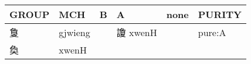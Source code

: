 \documentclass[14pt,a4paper]{scrartcl}
\begin{document}
\begin{longtable}[c]{@{}llllll@{}}
\toprule
\begin{minipage}[b]{0.14\columnwidth}\raggedright\strut
GROUP
\strut\end{minipage} &
\begin{minipage}[b]{0.14\columnwidth}\raggedright\strut
MCH
\strut\end{minipage} &
\begin{minipage}[b]{0.14\columnwidth}\raggedright\strut
B
\strut\end{minipage} &
\begin{minipage}[b]{0.14\columnwidth}\raggedright\strut
A
\strut\end{minipage} &
\begin{minipage}[b]{0.14\columnwidth}\raggedright\strut
none
\strut\end{minipage} &
\begin{minipage}[b]{0.14\columnwidth}\raggedright\strut
PURITY
\strut\end{minipage}\tabularnewline
\midrule
\endhead
\begin{minipage}[t]{0.14\columnwidth}\raggedright\strut
𢿌
\strut\end{minipage} &
\begin{minipage}[t]{0.14\columnwidth}\raggedright\strut
gjwieng
\strut\end{minipage} &
\begin{minipage}[t]{0.14\columnwidth}\raggedright\strut
\strut\end{minipage} &
\begin{minipage}[t]{0.14\columnwidth}\raggedright\strut
讂 xwenH
\strut\end{minipage} &
\begin{minipage}[t]{0.14\columnwidth}\raggedright\strut
\strut\end{minipage} &
\begin{minipage}[t]{0.14\columnwidth}\raggedright\strut
pure:A
\strut\end{minipage}\tabularnewline
\begin{minipage}[t]{0.14\columnwidth}\raggedright\strut
奐
\strut\end{minipage} &
\begin{minipage}[t]{0.14\columnwidth}\raggedright\strut
xwenH
\strut\end{minipage} &
\begin{minipage}[t]{0.14\columnwidth}\raggedright\strut
\strut\end{minipage} &
\begin{minipage}[t]{0.14\columnwidth}\raggedright\strut

\end{minipage}
\end{longtable}
\end{document}
